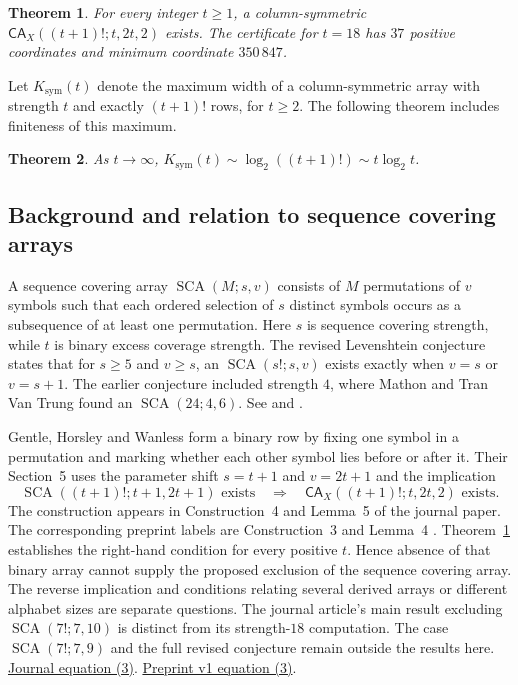 \documentclass[11pt]{article}
\newtheorem{theorem}{Theorem}
\newcommand{\cx}{\mathsf{CA}_{X}}
\newcommand{\Ksym}{K_{\mathrm{sym}}}
\begin{document}
\begin{theorem}\label{thm:twice}
For every integer \(t\ge1\), a column-symmetric
\(\cx((t+1)!;t,2t,2)\) exists. The certificate for \(t=18\) has \(37\)
positive coordinates and minimum coordinate \(350\,847\).
\end{theorem}

Let \(\Ksym(t)\) denote the maximum width of a column-symmetric
array with strength \(t\) and exactly \((t+1)!\) rows, for \(t\ge2\).
The following theorem includes finiteness of this maximum.

\begin{theorem}\label{thm:width}
As \(t\to\infty\), \(\Ksym(t)\sim\log_2((t+1)!)\sim t\log_2 t\).
\end{theorem}

\subsection{Background and relation to sequence covering arrays}
A sequence covering array \(\operatorname{SCA}(M;s,v)\) consists
of \(M\) permutations of \(v\) symbols such that each ordered
selection of \(s\) distinct symbols occurs as a subsequence of at
least one permutation. Here \(s\) is sequence covering strength, while
\(t\) is binary excess coverage strength. The revised Levenshtein
conjecture states that for \(s\ge5\) and \(v\ge s\), an
\(\operatorname{SCA}(s!;s,v)\) exists exactly when \(v=s\) or \(v=s+1\).
The earlier conjecture included strength \(4\), where Mathon and Tran
Van Trung found an \(\operatorname{SCA}(24;4,6)\).
See \cite[Section~1]{ghw} and \cite{mathon}.

Gentle, Horsley and Wanless form a binary row by fixing one symbol
in a permutation and marking whether each other symbol lies before
or after it. Their Section~5 uses the parameter shift \(s=t+1\)
and \(v=2t+1\) and the implication
\[
\operatorname{SCA}((t+1)!;t+1,2t+1)\text{ exists}
\quad\Longrightarrow\quad
\cx((t+1)!;t,2t,2)\text{ exists}.
\]
The construction appears in Construction~4 and Lemma~5 of the journal
paper. The corresponding preprint labels are Construction~3 and
Lemma~4 \cite[Section~2]{ghw}.
Theorem~\ref{thm:twice} establishes the right-hand condition for every
positive \(t\). Hence absence of that binary array cannot supply the
proposed exclusion of the sequence covering array. The reverse
implication and conditions relating several derived arrays or
different alphabet sizes are separate questions. The journal article's
main result excluding \(\operatorname{SCA}(7!;7,10)\) is distinct
from its strength-\(18\) computation. The case
\(\operatorname{SCA}(7!;7,9)\) and the full revised conjecture remain
outside the results here.
\href{https://link.springer.com/article/10.1007/s10623-025-01722-9#Equ3}
  {Journal equation (3)}.
\href{https://arxiv.org/html/2411.17145v1#S5.E3}{Preprint v1 equation (3)}.
\end{document}
